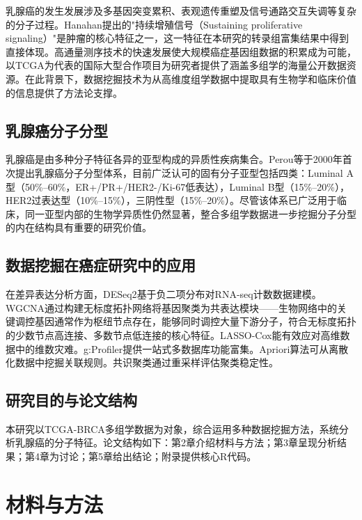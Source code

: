 \documentclass[12pt,a4paper,openany]{ctexbook}
\begin{document}
乳腺癌的发生发展涉及多基因突变累积、表观遗传重塑及信号通路交互失调等复杂的分子过程\cite{hanahan2011hallmarks}。Hanahan提出的"持续增殖信号（Sustaining proliferative signaling）"是肿瘤的核心特征之一\cite{hanahan2011hallmarks}，这一特征在本研究的转录组富集结果中得到直接体现。高通量测序技术的快速发展使大规模癌症基因组数据的积累成为可能，以TCGA\cite{tcga2012comprehensive}为代表的国际大型合作项目为研究者提供了涵盖多组学的海量公开数据资源。在此背景下，数据挖掘技术为从高维度组学数据中提取具有生物学和临床价值的信息提供了方法论支撑。

\section{乳腺癌分子分型}
乳腺癌是由多种分子特征各异的亚型构成的异质性疾病集合。Perou等\cite{perou2000molecular}于2000年首次提出乳腺癌分子分型体系，目前广泛认可的固有分子亚型包括四类：Luminal A型（50\%--60\%，ER+/PR+/HER2-/Ki-67低表达），Luminal B型（15\%--20\%），HER2过表达型（10\%--15\%），三阴性型（15\%--20\%）。尽管该体系已广泛用于临床，同一亚型内部的生物学异质性仍然显著，整合多组学数据进一步挖掘分子分型的内在结构具有重要的研究价值。

\section{数据挖掘在癌症研究中的应用}
在差异表达分析方面，DESeq2\cite{love2014moderated}基于负二项分布对RNA-seq计数数据建模。WGCNA\cite{langfelder2008wgcna}通过构建无标度拓扑网络将基因聚类为共表达模块——生物网络中的关键调控基因通常作为枢纽节点存在，能够同时调控大量下游分子，符合无标度拓扑的少数节点高连接、多数节点低连接的核心特征。LASSO-Cox\cite{simon2011regularization}能有效应对高维数据中的维数灾难。g:Profiler\cite{kolberg2023gprofiler}提供一站式多数据库功能富集。Apriori算法\cite{agrawal1994fast}可从离散化数据中挖掘关联规则。共识聚类\cite{wilkerson2010consensus}通过重采样评估聚类稳定性。

\section{研究目的与论文结构}
本研究以TCGA-BRCA多组学数据为对象，综合运用多种数据挖掘方法，系统分析乳腺癌的分子特征。论文结构如下：第2章介绍材料与方法；第3章呈现分析结果；第4章为讨论；第5章给出结论；附录提供核心R代码。

\chapter{材料与方法}
\end{document}
